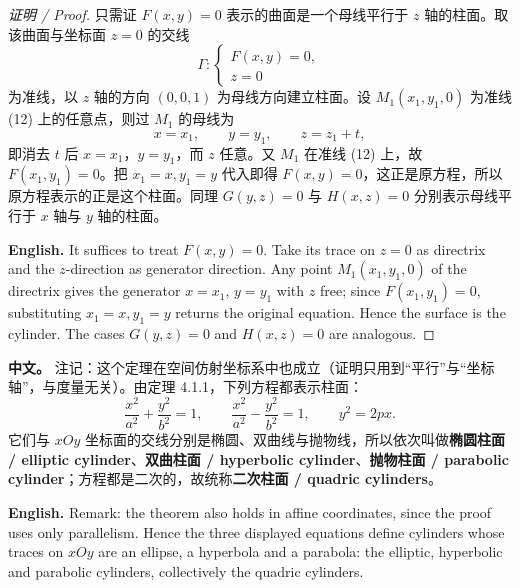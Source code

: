 \documentclass[UTF8,11pt,a4paper]{ctexart}
\newcommand{\APS}[2]{\par\noindent\textbf{中文。} #1\par\noindent\textbf{English.} #2\par\smallskip}
\newcommand{\EN}[1]{\par\noindent \textbf{English.} #1\par}
\theoremstyle{definition}
\begin{document}
\begin{proof}[证明 / Proof]
只需证 $F(x,y)=0$ 表示的曲面是一个母线平行于 $z$ 轴的柱面。取该曲面与坐标面 $z=0$ 的交线
\[
\Gamma:\begin{cases}F(x,y)=0,\\ z=0\end{cases}\tag{12}
\]
为准线，以 $z$ 轴的方向 $(0,0,1)$ 为母线方向建立柱面。设 $M_1(x_1,y_1,0)$ 为准线 (12) 上的任意点，则过 $M_1$ 的母线为
\[
x=x_1,\qquad y=y_1,\qquad z=z_1+t,\tag{13}
\]
即消去 $t$ 后 $x=x_1$，$y=y_1$，而 $z$ 任意。又 $M_1$ 在准线 (12) 上，故 $F(x_1,y_1)=0$。把 $x_1=x,y_1=y$ 代入即得 $F(x,y)=0$，这正是原方程，所以原方程表示的正是这个柱面。同理 $G(y,z)=0$ 与 $H(x,z)=0$ 分别表示母线平行于 $x$ 轴与 $y$ 轴的柱面。
\EN{It suffices to treat $F(x,y)=0$. Take its trace on $z=0$ as directrix and the $z$-direction as generator direction. Any point $M_1(x_1,y_1,0)$ of the directrix gives the generator $x=x_1$, $y=y_1$ with $z$ free; since $F(x_1,y_1)=0$, substituting $x_1=x,y_1=y$ returns the original equation. Hence the surface is the cylinder. The cases $G(y,z)=0$ and $H(x,z)=0$ are analogous.}
\end{proof}

\APS{注记：这个定理在空间仿射坐标系中也成立（证明只用到``平行''与``坐标轴''，与度量无关）。由定理 4.1.1，下列方程都表示柱面：
\[
\frac{x^2}{a^2}+\frac{y^2}{b^2}=1,\qquad \frac{x^2}{a^2}-\frac{y^2}{b^2}=1,\qquad y^2=2px.\tag{4.1-1--3}
\]
它们与 $xOy$ 坐标面的交线分别是椭圆、双曲线与抛物线，所以依次叫做\textbf{椭圆柱面 / elliptic cylinder}、\textbf{双曲柱面 / hyperbolic cylinder}、\textbf{抛物柱面 / parabolic cylinder}；方程都是二次的，故统称\textbf{二次柱面 / quadric cylinders}。}{Remark: the theorem also holds in affine coordinates, since the proof uses only parallelism. Hence the three displayed equations define cylinders whose traces on $xOy$ are an ellipse, a hyperbola and a parabola: the elliptic, hyperbolic and parabolic cylinders, collectively the quadric cylinders.}
\end{document}
